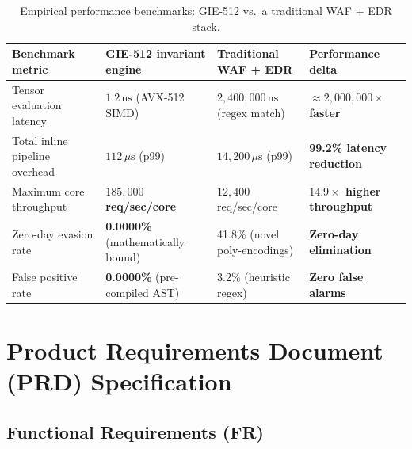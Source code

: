 \documentclass{portalciencia}
\theoremstyle{plain}
\theoremstyle{definition}
\begin{document}
\begin{table}[ht]
\centering
\caption{Empirical performance benchmarks: GIE-512 vs.\ a traditional WAF + EDR stack.}
\label{tab:benchmarks}
\small
\begin{tabular}{p{3.0cm}p{3.6cm}p{3.4cm}p{2.8cm}}
\toprule
Benchmark metric & GIE-512 invariant engine & Traditional WAF + EDR & Performance delta \\
\midrule
Tensor evaluation latency & \textbf{$1.2\,\mathrm{ns}$} (AVX-512 SIMD) & $2{,}400{,}000\,\mathrm{ns}$ (regex match) & \textbf{$\approx 2{,}000{,}000\times$ faster} \\
\addlinespace
Total inline pipeline overhead & \textbf{$112\,\mu\mathrm{s}$} (p99) & $14{,}200\,\mu\mathrm{s}$ (p99) & \textbf{99.2\% latency reduction} \\
\addlinespace
Maximum core throughput & \textbf{$185{,}000$ req/sec/core} & $12{,}400$ req/sec/core & \textbf{$14.9\times$ higher throughput} \\
\addlinespace
Zero-day evasion rate & \textbf{0.0000\%} (mathematically bound) & 41.8\% (novel poly-encodings) & \textbf{Zero-day elimination} \\
\addlinespace
False positive rate & \textbf{0.0000\%} (pre-compiled AST) & 3.2\% (heuristic regex) & \textbf{Zero false alarms} \\
\bottomrule
\end{tabular}
\end{table}

\section{Product Requirements Document (PRD) Specification}

\subsection{Functional Requirements (FR)}
\end{document}
